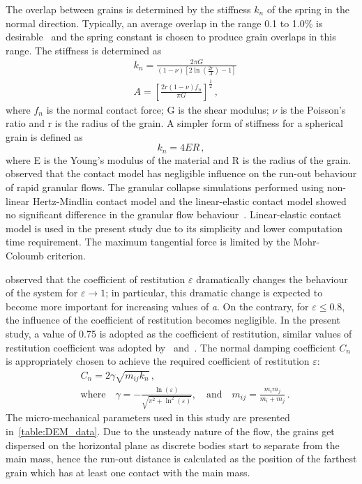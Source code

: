 The overlap between grains is determined by the stiffness 
$\textit{k}_{\textit{n}}$ of the spring in the normal direction. Typically, 
an average overlap in the range 0.1 to 1.0\% is desirable~\citep{Zenit2005} and 
the spring constant is chosen to produce grain overlaps in this range. The 
stiffness is determined as
\begin{align}
& \textit{k}_{\textit{n}}=\frac{2 \pi 
G}{(1-\nu)\left[2\ln(\frac{2r}{A})-1\right]} \\ 
& A = \left[\frac{2r(1-\nu)f_{n}}{\pi G}\right]^{\frac{1	}{2}}\,,
\end{align}
where $f_{n}$ is the normal contact force; G is the shear modulus; $\nu$ is the 
Poisson's ratio and r is the radius of the grain. A simpler form of stiffness 
for a spherical grain is defined as
\begin{equation}
\textit{k}_{\textit{n}}=4ER\,,
\end{equation}
where E is the Young's modulus of the material and R is the radius of the 
grain.~\citet{Cambou2009} observed that the contact model has negligible 
influence on the run-out behaviour of rapid granular flows. The granular 
collapse simulations performed using non-linear Hertz-Mindlin contact model and 
the linear-elastic contact model showed no significant difference in the 
granular flow behaviour~\citep{Utili2014}. Linear-elastic contact model is used 
in the present study due to its simplicity and lower computation time 
requirement. The maximum tangential force is limited by the Mohr-Coloumb 
criterion. 


\citet{Staron2007a} observed that the coefficient of restitution $\varepsilon$ 
dramatically changes the behaviour of the system for 
$\varepsilon\rightarrow 1$; in particular, this dramatic change is expected 
to become more important for increasing values of \textit{a}. On the contrary, 
for $\varepsilon \le 0.8$, the influence of the coefficient of restitution 
becomes 
negligible. In the present study, a value of 0.75 is adopted as the coefficient 
of restitution, similar values of restitution coefficient was adopted 
by~\citet{Girolami} and~\citet{Zenit2005}. The normal damping coefficient 
$C_{\textit{n}}$ 
is appropriately chosen to achieve the required coefficient of restitution 
$\varepsilon$:
\begin{align}
& C_{\textit{n}}=2\gamma \sqrt{m_{\textit{ij}}k_{\textit{n}}} \,,\\ 
& \mbox{where} \quad \gamma = -\frac{\ln(\varepsilon)}{\sqrt{\pi^{2}+\ln^2 
(\varepsilon)}},\quad \mbox{and} \quad 
\textit{m}_{\textit{ij}}=\frac{\textit{m}_{\textit{i}}\textit{m}_{\textit{j}}}{\textit{m}_{\textit{i}}
 + \textit{m}_{\textit{j}}} \,.
\end{align}
%
The micro-mechanical parameters used in this study are presented 
in~\cref{table:DEM_data}. Due to the unsteady nature of the flow, the 
grains get dispersed on the horizontal plane as discrete bodies start to 
separate from the main mass, hence the run-out distance is calculated as the 
position of the farthest grain which has at least one contact with the main 
mass.
%

